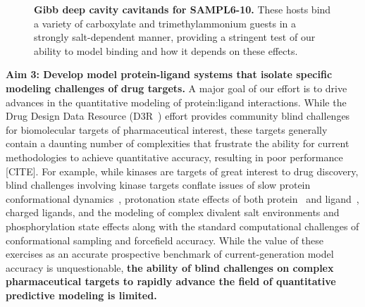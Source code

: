 \documentclass[11pt]{article}
\begin{document}
\begin{figure}[h]
\begin{centering}

\end{centering}

\vspace{0.1in}
\caption{\footnotesize {\bf Gibb deep cavity cavitands for SAMPL6-10.} These hosts bind a variety of carboxylate and trimethylammonium guests in a strongly salt-dependent manner, providing a stringent test of our ability to model binding and how it depends on these effects.
\label{figure:gdccs}}
\end{figure}


\textbf{Aim 3: Develop model protein-ligand systems that isolate specific modeling challenges of drug targets.}
A major goal of our effort is to drive advances in the quantitative modeling of protein:ligand interactions.
While the Drug Design Data Resource (D3R~\cite{gathiaka_d3r_2016}) effort provides community blind challenges for biomolecular targets of pharmaceutical interest, these targets generally contain a daunting number of complexities that frustrate the ability for current methodologies to achieve quantitative accuracy, resulting in poor performance [CITE].
For example, while kinases are targets of great interest to drug discovery, blind challenges involving kinase targets conflate issues of slow protein conformational dynamics~\cite{Lin:2013:Proc.Natl.Acad.Sci.}, protonation state effects of both protein~\cite{Shan:2009:PNAS} and ligand~\cite{Szakacs:2005:JournalofMedicinalChemistry,Grante:2014:SpectrochimicaActaPartA:MolecularandBiomolecularSpectroscopy}, charged ligands, and the modeling of complex divalent salt environments and phosphorylation state effects along with the standard computational challenges of conformational sampling and forcefield accuracy.
While the value of these exercises as an accurate prospective benchmark of current-generation model accuracy is unquestionable, {\bf the ability of blind challenges on complex pharmaceutical targets to rapidly advance the field of quantitative predictive modeling is limited.}
\end{document}
